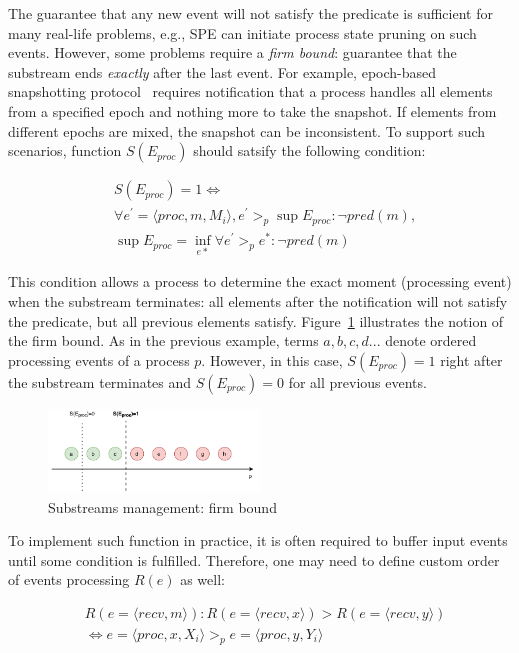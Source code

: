 The guarantee that any new event will not satisfy the predicate is sufficient for many real-life problems, e.g., SPE can initiate process state pruning on such events. However, some problems require a {\em firm bound}: guarantee that the substream ends {\em exactly} after the last event. For example, epoch-based snapshotting protocol~\cite{2015arXiv150608603C, jacques2016consistent} requires notification that a process handles all elements from a specified epoch and nothing more to take the snapshot. If elements from different epochs are mixed, the snapshot can be inconsistent. To support such scenarios, function $S(E_{proc})$ should satsify the following condition:

\begin{align*}
& S(E_{proc}) = 1  \Longleftrightarrow \\
& \forall e^{'} = \langle proc,m,M_i\rangle, e^{'} >_p \sup E_{proc} : \neg pred(m), \\
& \sup E_{proc} = \inf_{e*} \forall e^{'} >_p e^{*} : \neg pred(m) 
\end{align*}

This condition allows a process to determine the exact moment (processing event) when the substream terminates: all elements after the notification will not satisfy the predicate, but all previous elements satisfy. Figure~\ref{strict_guarantees} illustrates the notion of the firm bound. As in the previous example, terms $a,b,c,d...$ denote ordered processing events of a process $p$. However, in this case, $S(E_{proc})=1$ right after the substream terminates and $S(E_{proc})=0$ for all previous events.

\begin{figure}[htbp]
  \centering
  \includegraphics[width=0.50\textwidth]{pics/strict-guarantee.pdf}
  \caption{Substreams management: firm bound}
  \label{strict_guarantees}
\end{figure}

To implement such function in practice, it is often required to buffer input events until some condition is fulfilled. Therefore, one may need to define custom order of events processing $R(e)$ as well:

\begin{align*}
& R(e=\langle recv,m\rangle): R(e=\langle recv, x\rangle) > R(e=\langle recv, y\rangle) \\
& \Longleftrightarrow e=\langle proc,x,X_i\rangle >_p e=\langle proc,y,Y_i\rangle
\end{align*}

